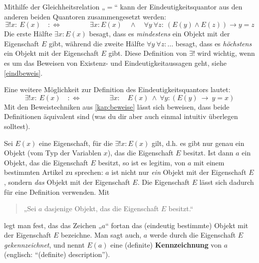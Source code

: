 \begin{bem} \label{eindquantzerlegung}
    Mithilfe der Gleichheitsrelation „$=$“ kann der Eindeutigkeitsquantor aus den anderen beiden Quantoren zusammengesetzt werden:
        \[ \exists ! x:\ E(x)\quad :\Leftrightarrow\qquad\qquad \exists x: E(x) \quad \land\quad \forall y\ \forall z:\ (E(y)\land E(z)) \to y=z \]
    Die erste Hälfte $\exists x: E(x)$ besagt, dass es \emph{mindestens} ein Objekt mit der Eigenschaft $E$ gibt, während die zweite Hälfte $\forall y\ \forall z:\dots$ besagt, dass es \emph{höchstens} ein Objekt mit der Eigenschaft $E$ gibt. Diese Definition von $\exists!$ wird wichtig, wenn es um das Beweisen von Existenz- und Eindeutigkeitaussagen geht, siehe \cref{eindbeweis}.

    Eine weitere Möglichkeit zur Definition des Eindeutigkeitsquantors lautet:
        \[ \exists ! x:\ E(x)\quad :\Leftrightarrow\qquad\qquad \exists x:\quad E(x)\ \land\ \forall y: (E(y)\ \to\ y=x) \]
    Mit den Beweistechniken aus \cref{kap:beweise} lässt sich beweisen, dass beide Definitionen äquivalent sind (was du dir aber auch einmal intuitiv überlegen solltest).
\end{bem}


\begin{nota} \label{kennzeichnung} 
    Sei $E(x)$ eine Eigenschaft, für die $\exists ! x: E(x)$ gilt, d.h. es gibt nur genau ein Objekt (vom Typ der Variablen $x$), das die Eigenschaft $E$ besitzt. Ist dann $a$ ein Objekt, das die Eigenschaft $E$ besitzt, so ist es legitim, von $a$ mit einem bestimmten Artikel zu sprechen: $a$ ist nicht nur \emph{ein} Objekt mit der Eigenschaft $E$, sondern \emph{das} Objekt mit der Eigenschaft $E$. Die Eigenschaft $E$ lässt sich dadurch für eine Definition verwenden. Mit
    \begin{quote}
        „Sei $a$ dasjenige Objekt, das die Eigenschaft $E$ besitzt.“
    \end{quote}
    legt man fest, das das Zeichen „$a$“ fortan das (eindeutig bestimmte) Objekt mit der Eigenschaft $E$ bezeichne. Man sagt auch, $a$ werde durch die Eigenschaft $E$ \emph{gekennzeichnet}, und nennt $E(a)$ eine (definite) \textbf{Kennzeichnung} von $a$ (englisch: ``(definite) description'').
\end{nota}


